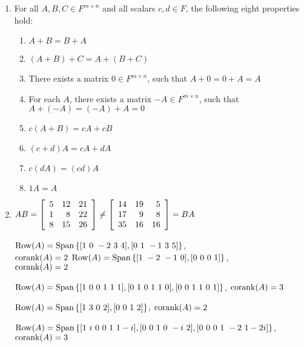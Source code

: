
\begin{enumerate}[!HW!, start=1]
\item  For all $A, B, C \in F^{m\times n}$ and all scalars $c, d\in F$, the following eight properties hold:
\begin{multicols}{2}
\begin{enumerate}[!DEF!, start=1]
\item $A+B = B+A$ 
\item $(A+B)+C = A+(B+C)$ 
\item There exists  a matrix $0\in F^{m\times n}$, such that $A+0 = 0 + A = A$ 
\item For each $A$, there exists a matrix $-A\in F^{m\times n}$, such that $A + (-A) = (-A) + A = 0$ \columnbreak
\item $c(A+B) = cA + cB$ 
\item $(c+d)A = cA + dA$
\item $c(dA) = (cd)A$ 
\item $1A = A$
\end{enumerate}
\end{multicols}

\item $AB=\mtx{rrr}{5&12&21\\1&8&22\\8&15&26}\neq \mtx{rrr}{14&19&5\\17&9&8\\35&16&16}=BA$ %
\begin{multicols}{2}
\itemspade $\row(A)=\Span\left\{[1\ 0\ -2 \ 3\ 4], [0\ 1\ -1\ 3\ 5]\right\}$,\\ $\corank(A) = 2$
\itemspade $\row(A)=\Span\left\{[1\ -2\ -1\ 0], [0\ 0\ 0\ 1]\right\}$,\\ $\corank(A) = 2$
\end{multicols}

\itemspade 
$\row(A)=\Span\left\{[1\ 0\ 0\ 1\ 1\ 1], [0\ 1\ 0\ 1\ 1\ 0], [0\ 0\ 1\ 1\ 0\ 1]\right\}$, $\corank(A) = 3$ %

\itemspade $\row(A)=\Span\left\{[1\ 3\ 0\ 2], [0\ 0\ 1\ 2]\right\}$, $\corank(A) = 2$ %

\itemspade $\row(A)=\Span\left\{[1\ i\ 0\ 0\ 1\ 1-i], [0\ 0\ 1\ 0\ -i\ 2], [0\ 0\ 0\ 1\ -2\ 1-2i]\right\}$, $\corank(A) = 3$ %


\end{enumerate}
